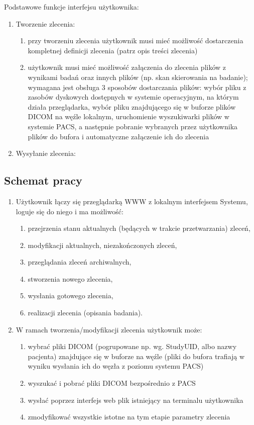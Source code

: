 \documentclass[a4paper]{article}
\begin{document}
Podstawowe funkcje interfejsu użytkownika:
\begin{enumerate}
  \item Tworzenie zlecenia:
      \begin{enumerate}
      \item przy tworzeniu zlecenia użytkownik musi mieć możliwość dostarczenia kompletnej definicji zlecenia (patrz opis treści zlecenia)
      \item użytkownik musi mieć możliwość załączenia do zlecenia plików z wynikami badań oraz innych plików (np. skan  skierowania na badanie); wymagana jest obsługa 3 sposobów dostarczania plików: wybór pliku z zasobów dyskowych dostępnych w systemie operacyjnym, na którym działa przeglądarka, wybór pliku znajdującego się w buforze plików DICOM na węźle lokalnym, uruchomienie wyszukiwarki plików w systemie PACS, a następnie pobranie wybranych przez użytkownika plików do bufora i automatyczne załączenie ich do zlecenia
      \end{enumerate}
  \item Wysyłanie zlecenia:
\end{enumerate}

\subsection{Schemat pracy}
\begin{enumerate}
\item Użytkownik łączy się przeglądarką WWW z lokalnym interfejsem Systemu, loguje się do niego i ma możliwość:
        \begin{enumerate}
        \item przejrzenia stanu aktualnych (będących w trakcie przetwarzania) zleceń,
        \item modyfikacji aktualnych, niezakończonych zleceń,
        \item przeglądania zleceń archiwalnych,
        \item stworzenia nowego zlecenia,
        \item wysłania gotowego zlecenia,
        \item realizacji zlecenia (opisania badania).
        \end{enumerate}
\item W ramach tworzenia/modyfikacji zlecenia użytkownik może:
        \begin{enumerate}
        \item wybrać pliki DICOM (pogrupowane np. wg. StudyUID, albo nazwy pacjenta) znajdujące się w buforze na węźle (pliki do bufora trafiają w wyniku wysłania ich do węzła z poziomu systemu PACS)
        \item wyszukać i pobrać pliki DICOM bezpośrednio z PACS
        \item wysłać poprzez interfejs web plik istniejący na terminalu użytkownika
        \item zmodyfikować wszystkie istotne na tym etapie parametry zlecenia
        \end{enumerate}
\end{enumerate}
\end{document}
